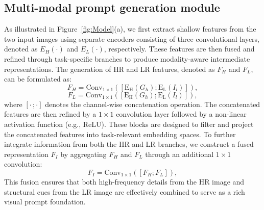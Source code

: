 \documentclass[lettersize,journal]{IEEEtran}
\begin{document}
\subsection{Multi-modal prompt generation module}
As illustrated in Figure~\ref{fig:Model}(a), we first extract shallow features from the two input images using separate encoders consisting of three convolutional layers, denoted as $E_H(\cdot)$ and $E_L(\cdot)$, respectively.
These features are then fused and refined through task-specific branches to produce modality-aware intermediate representations. 
The generation of HR and LR features, denoted as $F_H$ and $F_L$, can be formulated as:
\begin{equation}
    F_H = \mathrm{Conv_{1\times 1}}([\mathrm{E_H}(G_h); \mathrm{E_L}(I_l)]),
\end{equation}
\begin{equation}
    F_L = \mathrm{Conv_{1\times 1}}([\mathrm{E_H}(G_h); \mathrm{E_L}(I_l)]),
\end{equation}
where $[\cdot\,;\cdot]$ denotes the channel-wise concatenation operation. The concatenated features are then refined by a $1 \times 1$ convolution layer followed by a non-linear activation function (e.g., ReLU). These blocks are designed to filter and project the concatenated features into task-relevant embedding spaces.
To further integrate information from both the HR and LR branches, we construct a fused representation $F_I$ by aggregating $F_H$ and $F_L$ through an additional $1\times 1$ convolution:
\begin{equation}
    F_I = \mathrm{Conv_{1\times 1}}([F_H; F_L]),
\end{equation}
This fusion ensures that both high-frequency details from the HR image and structural cues from the LR image are effectively combined to serve as a rich visual prompt foundation.
\end{document}
